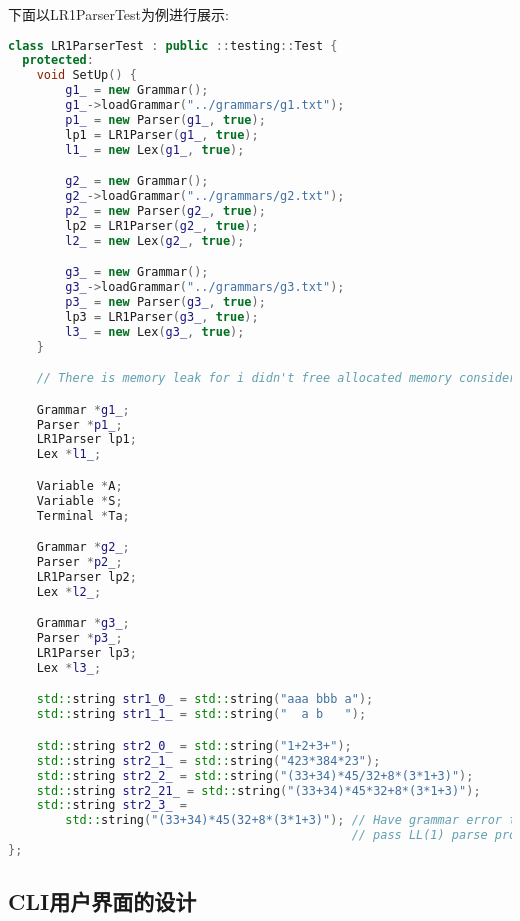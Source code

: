 下面以LR1ParserTest为例进行展示:
\begin{lstlisting}[language=c++]
class LR1ParserTest : public ::testing::Test {
  protected:
    void SetUp() {
        g1_ = new Grammar();
        g1_->loadGrammar("../grammars/g1.txt");
        p1_ = new Parser(g1_, true);
        lp1 = LR1Parser(g1_, true);
        l1_ = new Lex(g1_, true);

        g2_ = new Grammar();
        g2_->loadGrammar("../grammars/g2.txt");
        p2_ = new Parser(g2_, true);
        lp2 = LR1Parser(g2_, true);
        l2_ = new Lex(g2_, true);

        g3_ = new Grammar();
        g3_->loadGrammar("../grammars/g3.txt");
        p3_ = new Parser(g3_, true);
        lp3 = LR1Parser(g3_, true);
        l3_ = new Lex(g3_, true);
    }

    // There is memory leak for i didn't free allocated memory considering tight time.

    Grammar *g1_;
    Parser *p1_;
    LR1Parser lp1;
    Lex *l1_;

    Variable *A;
    Variable *S;
    Terminal *Ta;

    Grammar *g2_;
    Parser *p2_;
    LR1Parser lp2;
    Lex *l2_;

    Grammar *g3_;
    Parser *p3_;
    LR1Parser lp3;
    Lex *l3_;

    std::string str1_0_ = std::string("aaa bbb a");
    std::string str1_1_ = std::string("  a b   ");

    std::string str2_0_ = std::string("1+2+3+");
    std::string str2_1_ = std::string("423*384*23");
    std::string str2_2_ = std::string("(33+34)*45/32+8*(3*1+3)");
    std::string str2_21_ = std::string("(33+34)*45*32+8*(3*1+3)");
    std::string str2_3_ =
        std::string("(33+34)*45(32+8*(3*1+3)"); // Have grammar error that can't
                                                // pass LL(1) parse process.
};
\end{lstlisting}

\subsection{CLI用户界面的设计}
